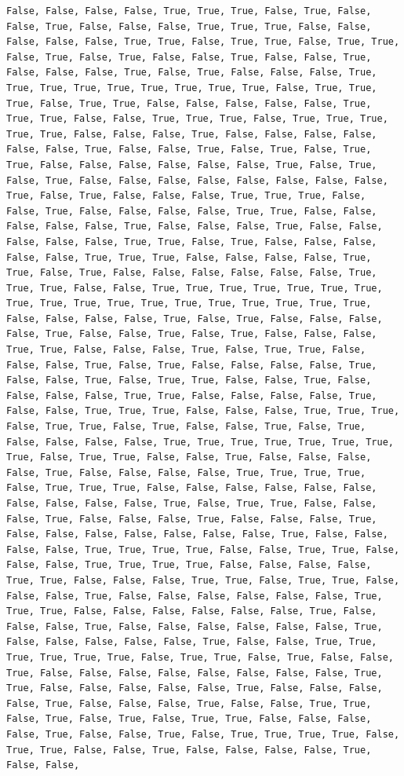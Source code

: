 \documentclass[
  letterpaper,
  DIV=11,
  numbers=noendperiod]{scrartcl}
\begin{document}
\begin{verbatim}
False, False, False, False, True, True, True, False, True, False, False, True, False, False, False, True, True, True, False, False, False, False, False, True, True, False, True, True, False, True, True, False, True, False, True, False, False, True, False, False, True, False, False, False, True, False, True, False, False, False, True, True, True, True, True, True, True, True, True, False, True, True, True, False, True, True, False, False, False, False, False, True, True, True, False, False, True, True, True, False, True, True, True, True, True, False, False, False, True, False, False, False, False, False, False, True, False, False, True, False, True, False, True, True, False, False, False, False, False, False, True, False, True, False, True, False, False, False, False, False, False, False, False, True, False, True, False, False, False, True, True, True, False, False, True, False, False, False, False, True, True, False, False, False, False, False, True, False, False, False, True, False, False, False, False, False, True, True, False, True, False, False, False, False, False, True, True, True, False, False, False, False, True, True, False, True, False, False, False, False, False, False, True, True, True, False, False, True, True, True, True, True, True, True, True, True, True, True, True, True, True, True, True, True, True, False, False, False, False, True, False, True, False, False, False, False, True, False, False, True, False, True, False, False, False, True, True, False, False, False, True, False, True, True, False, False, False, True, False, True, False, False, False, False, True, False, False, True, False, True, True, False, False, True, False, False, False, False, True, True, False, False, False, False, True, False, False, True, True, True, False, False, False, True, True, True, False, True, True, False, True, False, False, True, False, True, False, False, False, False, True, True, True, True, True, True, True, True, False, True, True, False, False, True, False, False, False, False, True, False, False, False, False, True, True, True, True, False, True, True, True, False, False, False, False, False, False, False, False, False, False, True, False, True, True, False, False, False, True, False, False, False, True, False, False, False, True, False, False, False, False, False, False, False, True, False, False, False, False, True, True, True, True, False, False, True, True, False, False, False, True, True, True, True, False, False, False, False, True, True, False, False, False, True, True, False, True, True, False, False, False, True, False, False, False, False, False, False, True, True, True, False, False, False, False, False, False, True, False, False, False, True, False, False, False, False, False, False, True, False, False, False, False, False, True, False, False, True, True, True, True, True, True, False, True, True, False, True, False, False, True, False, False, False, False, False, False, False, False, True, True, False, False, False, False, False, True, False, False, False, False, True, False, False, False, True, False, False, True, True, False, True, False, True, False, True, True, False, False, False, False, True, False, False, True, False, True, True, True, True, False, True, True, False, False, True, False, False, False, False, True, False, False, 
\end{verbatim}
\end{document}
